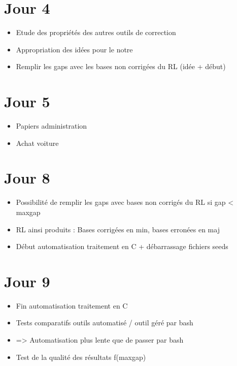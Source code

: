 \documentclass[12pt]{report}
\begin{document}
\section{Jour 4}

\begin{itemize}
  \item Etude des propriétés des autres outils de correction

  \item Appropriation des idées pour le notre

  \item Remplir les gaps avec les bases non corrigées du RL (idée + début)
\end{itemize}

\section{Jour 5}

\begin{itemize}
  \item Papiers administration

  \item Achat voiture
\end{itemize}

\section{Jour 8}

\begin{itemize}
  \item Possibilité de remplir les gaps avec bases non corrigés du RL si gap < maxgap

  \item RL ainsi produits : Bases corrigées en min, bases erronées en maj

  \item Début automatisation traitement en C + débarrassage fichiers seeds
\end{itemize}

\section{Jour 9}

\begin{itemize}
  \item Fin automatisation traitement en C

  \item Tests comparatifs outils automatisé / outil géré par bash

  \item => Automatisation plus lente que de passer par bash

  \item Test de la qualité des résultats f(maxgap)
\end{itemize}
\end{document}
